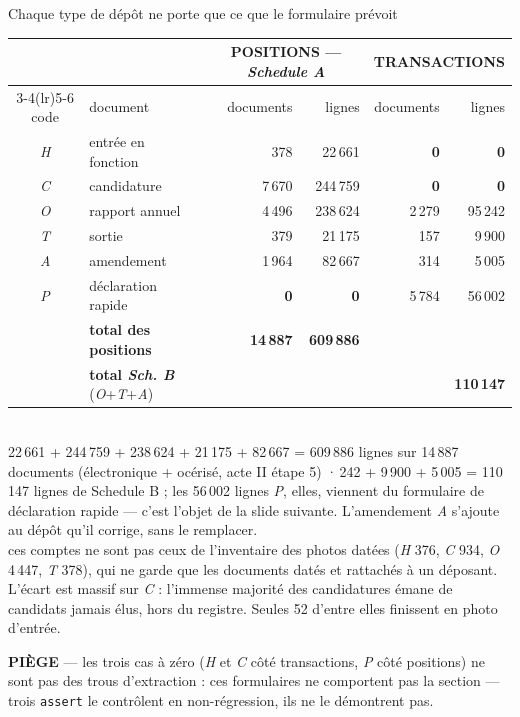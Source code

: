\documentclass[11pt,aspectratio=169]{beamer}
\newcommand{\co}[1]{\texttt{#1}}
\newcommand{\defl}[1]{{\scriptsize\color{black!55}#1}}
\newcommand{\piege}[1]{%
  \colorbox{warnorange!12}{\parbox{\dimexpr\linewidth-8pt}{\scriptsize
    \textbf{\textcolor{warnorange}{PIÈGE}}\; --- #1}}}
\begin{document}
\begin{frame}{Chaque type de dépôt ne porte que ce que le formulaire prévoit}
  \centering\scriptsize
  \begin{tabular}{@{}clrrrr@{}}
    \toprule
    & & \multicolumn{2}{c}{\textbf{POSITIONS} --- \emph{Schedule A}}
      & \multicolumn{2}{c}{\textbf{TRANSACTIONS}}\\
    \cmidrule(lr){3-4}\cmidrule(lr){5-6}
    code & document & documents & lignes & documents & lignes\\
    \midrule
    \emph{H} & entrée en fonction   &    378 &  22\,661 & \textbf{0} & \textbf{0}\\
    \emph{C} & candidature          & 7\,670 & 244\,759 & \textbf{0} & \textbf{0}\\
    \emph{O} & rapport annuel       & 4\,496 & 238\,624 & 2\,279 & 95\,242\\
    \emph{T} & sortie               &    379 &  21\,175 &    157 &  9\,900\\
    \emph{A} & amendement           & 1\,964 &  82\,667 &    314 &  5\,005\\
    \emph{P} & déclaration rapide   & \textbf{0} & \textbf{0} & 5\,784 & 56\,002\\
    \midrule
    & \textbf{total des positions} & \textbf{14\,887} & \textbf{609\,886} & & \\
    & \textbf{total \emph{Sch. B}} (\emph{O}+\emph{T}+\emph{A}) & & & & \textbf{110\,147}\\
    \bottomrule
  \end{tabular}\\[1mm]
  \defl{22\,661 + 244\,759 + 238\,624 + 21\,175 + 82\,667 = 609\,886 lignes sur 14\,887 documents
  (électronique + océrisé, acte II étape 5) \;·\; 95\,242 + 9\,900 + 5\,005 = 110\,147 lignes de
  Schedule B ; les 56\,002 lignes \emph{P}, elles, viennent du formulaire de déclaration rapide ---
  c'est l'objet de la slide suivante. L'amendement \emph{A} s'ajoute au dépôt qu'il corrige, sans
  le remplacer.}\\[0.4mm]
  \defl{ces comptes ne sont pas ceux de l'inventaire des photos datées (\emph{H} 376, \emph{C} 934,
  \emph{O} 4\,447, \emph{T} 378), qui ne garde que les documents datés et rattachés à un déposant.
  L'écart est massif sur \emph{C} : l'immense majorité des candidatures émane de candidats jamais
  élus, hors du registre. Seules 52 d'entre elles finissent en photo d'entrée.}\\[0.4mm]
  \piege{les trois cas à zéro (\emph{H} et \emph{C} côté transactions, \emph{P} côté positions) ne
  sont pas des trous d'extraction : ces formulaires ne comportent pas la section --- trois
  \co{assert} le contrôlent en non-régression, ils ne le démontrent pas.}
\end{frame}
\end{document}
